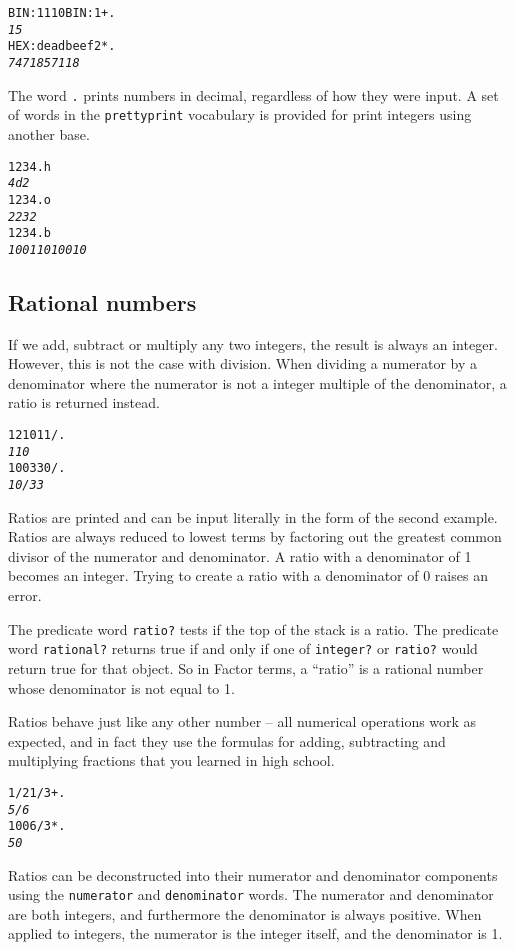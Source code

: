 \documentclass[english]{article}
\begin{document}
\begin{alltt}
BIN: 1110 BIN: 1 + .
\emph{15}
HEX: deadbeef 2 * .
\emph{7471857118}
\end{alltt}

The word \texttt{.} prints numbers in decimal, regardless of how they were input. A set of words in the \texttt{prettyprint} vocabulary is provided for print integers using another base.

\begin{alltt}
1234 .h
\emph{4d2}
1234 .o
\emph{2232}
1234 .b
\emph{10011010010}
\end{alltt}

\subsection{Rational numbers}

If we add, subtract or multiply any two integers, the result is always an integer. However, this is not the case with division. When dividing a numerator by a denominator where the numerator is not a integer multiple of the denominator, a ratio is returned instead.

\begin{alltt}
1210 11 / .
\emph{110}
100 330 / .
\emph{10/33}
\end{alltt}

Ratios are printed and can be input literally in the form of the second example. Ratios are always reduced to lowest terms by factoring out the greatest common divisor of the numerator and denominator. A ratio with a denominator of 1 becomes an integer. Trying to create a ratio with a denominator of 0 raises an error.

The predicate word \texttt{ratio?} tests if the top of the stack is a ratio. The predicate word \texttt{rational?} returns true if and only if one of \texttt{integer?} or \texttt{ratio?} would return true for that object. So in Factor terms, a ``ratio'' is a rational number whose denominator is not equal to 1.

Ratios behave just like any other number -- all numerical operations work as expected, and in fact they use the formulas for adding, subtracting and multiplying fractions that you learned in high school.

\begin{alltt}
1/2 1/3 + .
\emph{5/6}
100 6 / 3 * .
\emph{50}
\end{alltt}

Ratios can be deconstructed into their numerator and denominator components using the \texttt{numerator} and \texttt{denominator} words. The numerator and denominator are both integers, and furthermore the denominator is always positive. When applied to integers, the numerator is the integer itself, and the denominator is 1.
\end{document}
